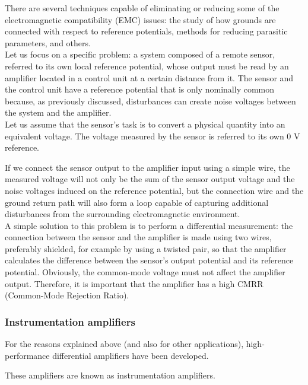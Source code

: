 \documentclass[../main.tex]{subfiles}
\begin{document}
There are several techniques capable of eliminating or reducing some of the electromagnetic compatibility (EMC) issues: the study of how grounds are connected with respect to reference potentials, methods for reducing parasitic parameters, and others.\\

Let us focus on a specific problem: a system composed of a remote sensor, referred to its own local reference potential, whose output must be read by an amplifier located in a control unit at a certain distance from it. The sensor and the control unit have a reference potential that is only nominally common because, as previously discussed, disturbances can create noise voltages between the system and the amplifier.\\

Let us assume that the sensor’s task is to convert a physical quantity into an equivalent voltage. The voltage measured by the sensor is referred to its own 0 V reference. 


If we connect the sensor output to the amplifier input using a simple wire, the measured voltage will not only be the sum of the sensor output voltage and the noise voltages induced on the reference potential, but the connection wire and the ground return path will also form a loop capable of capturing additional disturbances from the surrounding electromagnetic environment.\\

A simple solution to this problem is to perform a differential measurement: the connection between the sensor and the amplifier is made using two wires, preferably shielded, for example by using a twisted pair, so that the amplifier calculates the difference between the sensor’s output potential and its reference potential. Obviously, the common-mode voltage must not affect the amplifier output. Therefore, it is important that the amplifier has a high CMRR (Common-Mode Rejection Ratio).



\subsubsection{Instrumentation amplifiers}

For the reasons explained above (and also for other applications), high-performance differential amplifiers have been developed. 

These amplifiers are known as instrumentation amplifiers. 
\end{document}

